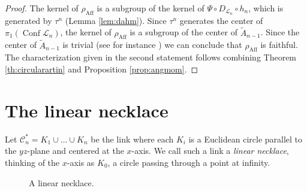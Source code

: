 \documentclass[11pt]{amsart}
\begin{document}
\begin{proof}
The kernel of $\rho_{\mathop{\mathrm{Aff}}\nolimits} $ is a subgroup of the kernel of $\Psi \circ D_{\mathcal{L}_n} \circ h_n$, which is generated by $\tau^n$ (Lemma \ref{lem:dahm}).
Since $\tau^n$ generates the center of $\pi_1({\mathop{\mathrm{Conf}}\nolimits} \mathcal{L}_n)$, the kernel of  $\rho_{\mathop{\mathrm{Aff}}\nolimits} $ is a subgroup of the center of  $\tilde{A}_{n-1}$.
Since the center of $\tilde{A}_{n-1} $ is trivial (see for instance \cite{JA}) we can conclude that $\rho_{\mathop{\mathrm{Aff}}\nolimits}$ is faithful. The characterization given in the second statement follows 
 combining Theorem \ref{th:circularartin} and Proposition \ref{prop:angmom}.
\end{proof}

\section{The linear necklace}
\label{ssec:linearnecklace}

Let $\mathcal{C}^*_n =  K_1 \cup\ldots\cup K_n$ be the link where
each $K_i$ is a Euclidean circle  parallel to the $yz$-plane and centered at the $x$-axis.
We call such a  link a {\emph{{linear necklace}}}, thinking of the $x$-axis as $K_0$, a circle
passing through a point at infinity.
\begin{figure}
 

 \caption{A linear necklace. \label{fig:linearnecklace}}
\end{figure}
\end{document}
